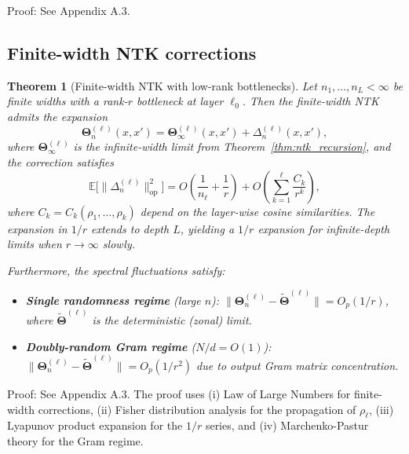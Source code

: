 \documentclass{article}
\newcommand{\Kop}{\boldsymbol{\Theta}}
\newtheorem{theorem}{Theorem}
\begin{document}
Proof: See Appendix A.3.

\vspace{1em}
\subsection{Finite-width NTK corrections}

\begin{theorem}[Finite-width NTK with low-rank bottlenecks]
\label{thm:finite_width_ntk}
Let \( n_1, \dots, n_L < \infty \) be finite widths with a rank-\( r \) bottleneck at layer \( \ell_0 \). Then the finite-width NTK admits the expansion
\[
\Kop^{(\ell)}_n(x,x') = \Kop^{(\ell)}_\infty(x,x') + \Delta^{(\ell)}_n(x,x'),
\]
where \( \Kop^{(\ell)}_\infty \) is the infinite-width limit from Theorem~\ref{thm:ntk_recursion}, and the correction satisfies
\[
\mathbb{E}\big[\|\Delta^{(\ell)}_n\|_{\text{op}}^2\big] = O\!\left(\frac{1}{n_\ell} + \frac{1}{r}\right) + O\!\left(\sum_{k=1}^{\ell} \frac{C_k}{r^k}\right),
\]
where \( C_k = C_k(\rho_1, \dots, \rho_k) \) depend on the layer-wise cosine similarities. The expansion in \( 1/r \) extends to depth \( L \), yielding a \( 1/r \) expansion for infinite-depth limits when \( r \to \infty \) slowly.

Furthermore, the spectral fluctuations satisfy:
\begin{itemize}
    \item \textbf{Single randomness regime} (large \( n \)): \( \big\|\Kop^{(\ell)}_n - \tilde{\Kop}^{(\ell)}\big\| = O_p(1/r) \), where \( \tilde{\Kop}^{(\ell)} \) is the deterministic (zonal) limit.
    \item \textbf{Doubly-random Gram regime} (\( N/d = O(1) \)): \( \big\|\Kop^{(\ell)}_n - \tilde{\Kop}^{(\ell)}\big\| = O_p(1/r^2) \) due to output Gram matrix concentration.
\end{itemize}
\end{theorem}

Proof: See Appendix A.3. The proof uses (i) Law of Large Numbers for finite-width corrections, (ii) Fisher distribution analysis for the propagation of \( \rho_\ell \), (iii) Lyapunov product expansion for the \( 1/r \) series, and (iv) Marchenko-Pastur theory for the Gram regime.
\end{document}
